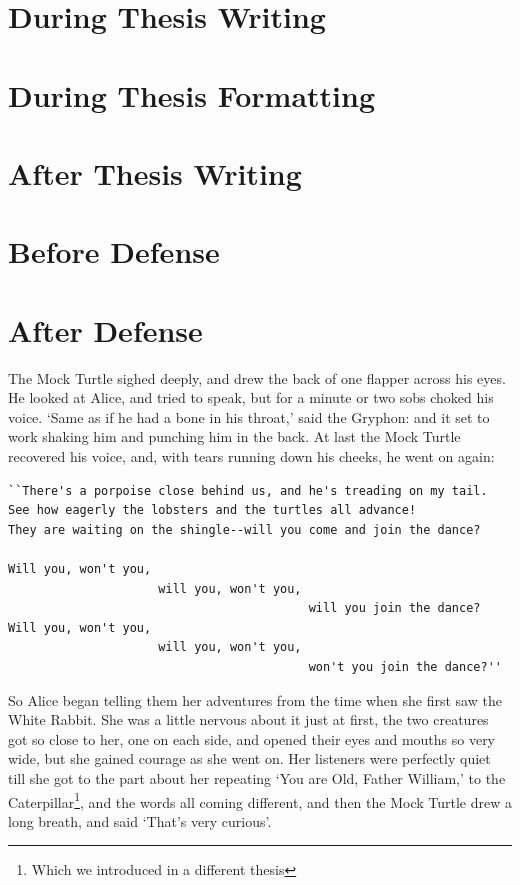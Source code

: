 \documentclass[10pt,chapterheads]{ucsd}
\begin{document}
\section{During Thesis Writing}
\section{During Thesis Formatting}
\section{After Thesis Writing}
\section{Before Defense}
\section{After Defense}

The Mock Turtle sighed deeply, and drew the back of one flapper across his eyes. He looked at Alice, and tried to speak, but for a minute or two sobs choked his voice. `Same as if he had a bone in his throat,' said the Gryphon: and it set to work shaking him and punching him in the back. At last the Mock Turtle recovered his voice, and, with tears running down his cheeks, he went on again:


\begin{verbatim}
``There's a porpoise close behind us, and he's treading on my tail.
See how eagerly the lobsters and the turtles all advance!
They are waiting on the shingle--will you come and join the dance?

Will you, won't you, 
                     will you, won't you, 
                                          will you join the dance?
Will you, won't you, 
                     will you, won't you, 
                                          won't you join the dance?''
\end{verbatim}



So Alice began telling them her adventures from the time when she first saw the White Rabbit. She was a little nervous about it just at first, the two creatures got so close to her, one on each side, and opened their eyes and mouths so very wide, but she gained courage as she went on. Her listeners were perfectly quiet till she got to the part about her repeating `You are Old, Father William,' to the Caterpillar\footnote{Which we introduced in a different thesis}, and the words all coming different, and then the Mock Turtle drew a long breath, and said `That's very curious'.
\end{document}
